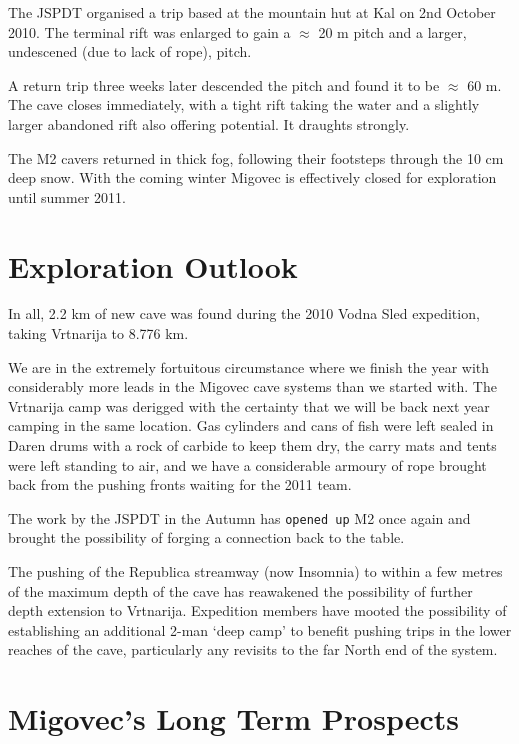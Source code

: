 The JSPDT organised a trip based at the mountain hut at Kal on 2nd
October 2010. The terminal rift was enlarged to gain a \(\approx\) 20 m
pitch and a larger, undescened (due to lack of rope), pitch.

A return trip three weeks later descended the pitch and found it to be
\(\approx\) 60 m. The cave closes immediately, with a tight rift taking
the water and a slightly larger abandoned rift also offering potential.
It draughts strongly.

The M2 cavers returned in thick fog, following their footsteps through
the 10 cm deep snow. With the coming winter Migovec is effectively
closed for exploration until summer 2011.

\section{Exploration Outlook}\label{exploration-outlook}

In all, 2.2 km of new cave was found during the 2010 Vodna Sled
expedition, taking Vrtnarija to 8.776 km.

We are in the extremely fortuitous circumstance where we finish the year
with considerably more leads in the Migovec cave systems than we started
with. The Vrtnarija camp was derigged with the certainty that we will be
back next year camping in the same location. Gas cylinders and cans of
fish were left sealed in Daren drums with a rock of carbide to keep them
dry, the carry mats and tents were left standing to air, and we have a
considerable armoury of rope brought back from the pushing fronts
waiting for the 2011 team.

The work by the JSPDT in the Autumn has \texttt{opened\ up} M2 once
again and brought the possibility of forging a connection back to the
table.

The pushing of the Republica streamway (now Insomnia) to within a few
metres of the maximum depth of the cave has reawakened the possibility
of further depth extension to Vrtnarija. Expedition members have mooted
the possibility of establishing an additional 2-man `deep camp' to
benefit pushing trips in the lower reaches of the cave, particularly any
revisits to the far North end of the system.

\section{Migovec's Long Term
Prospects}\label{migovecs-long-term-prospects}

